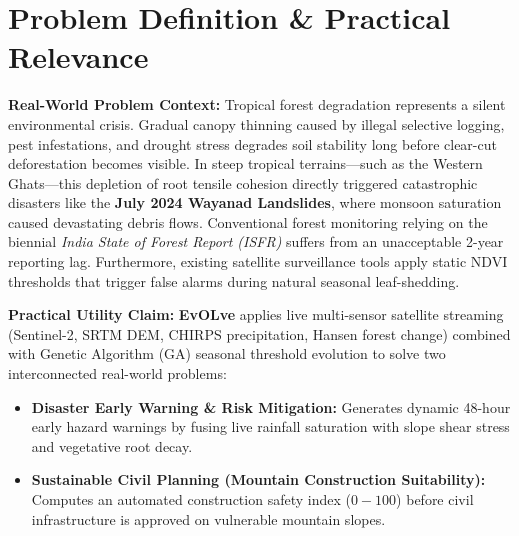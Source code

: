 \documentclass[11pt, a4paper]{article}
\begin{document}

\section{Problem Definition \& Practical Relevance}
\textbf{Real-World Problem Context:} Tropical forest degradation represents a silent environmental crisis. Gradual canopy thinning caused by illegal selective logging, pest infestations, and drought stress degrades soil stability long before clear-cut deforestation becomes visible. In steep tropical terrains—such as the Western Ghats—this depletion of root tensile cohesion directly triggered catastrophic disasters like the \textbf{July 2024 Wayanad Landslides}, where monsoon saturation caused devastating debris flows. Conventional forest monitoring relying on the biennial \textit{India State of Forest Report (ISFR)} suffers from an unacceptable 2-year reporting lag. Furthermore, existing satellite surveillance tools apply static NDVI thresholds that trigger false alarms during natural seasonal leaf-shedding.

\noindent
\textbf{Practical Utility Claim:} \textbf{EvOLve} applies live multi-sensor satellite streaming (Sentinel-2, SRTM DEM, CHIRPS precipitation, Hansen forest change) combined with Genetic Algorithm (GA) seasonal threshold evolution to solve two interconnected real-world problems:
\begin{itemize}[noitemsep, topsep=1pt]
    \item \textbf{Disaster Early Warning \& Risk Mitigation:} Generates dynamic 48-hour early hazard warnings by fusing live rainfall saturation with slope shear stress and vegetative root decay.
    \item \textbf{Sustainable Civil Planning (Mountain Construction Suitability):} Computes an automated construction safety index ($0 - 100$) before civil infrastructure is approved on vulnerable mountain slopes.
\end{itemize}

\end{document}
